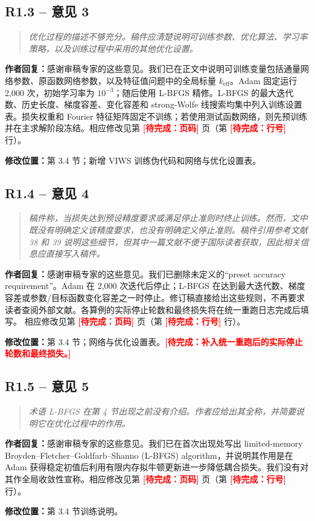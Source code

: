 \documentclass[11pt,a4paper]{article}
\newenvironment{reviewercomment}{\begin{quote}\small\itshape\color{commentgray}}{\end{quote}}
\newcommand{\authorresponse}{\noindent\textbf{作者回复：}\quad}
\newcommand{\revisionlocation}[1]{\par\noindent\textcolor{locationblue}{\textbf{修改位置：}}#1}
\newcommand{\draftplaceholder}[1]{\textcolor{red}{\textbf{[待完成：#1]}}}
\begin{document}
\subsection*{R1.3 -- 意见 3}
\begin{reviewercomment}
优化过程的描述不够充分。稿件应清楚说明可训练参数、优化算法、学习率策略，以及训练过程中采用的其他优化设置。
\end{reviewercomment}
\authorresponse 感谢审稿专家的这些意见。我们已在正文中说明可训练变量包括通量网络参数、原函数网络参数，以及特征值问题中的全局标量 $k_{\mathrm{eff}}$。Adam 固定运行 2,000 次，初始学习率为 $10^{-3}$；随后使用 L-BFGS 精修。L-BFGS 的最大迭代数、历史长度、梯度容差、变化容差和 strong-Wolfe 线搜索均集中列入训练设置表。损失权重和 Fourier 特征矩阵固定不训练；若使用测试函数网络，则先预训练并在主求解阶段冻结。相应修改见第 \draftplaceholder{页码} 页（第 \draftplaceholder{行号} 行）。
\revisionlocation{第 3.4 节；新增 VIWS 训练伪代码和网络与优化设置表。}

\subsection*{R1.4 -- 意见 4}
\begin{reviewercomment}
稿件称，当损失达到预设精度要求或满足停止准则时终止训练。然而，文中既没有明确定义该精度要求，也没有明确定义停止准则。稿件引用参考文献 38 和 39 说明这些细节，但其中一篇文献不便于国际读者获取，因此相关信息应直接写入稿件。
\end{reviewercomment}
\authorresponse 感谢审稿专家的这些意见。我们已删除未定义的“preset accuracy requirement”。Adam 在 2,000 次迭代后停止；L-BFGS 在达到最大迭代数、梯度容差或参数/目标函数变化容差之一时停止。修订稿直接给出这些规则，不再要求读者查阅外部文献。各算例的实际停止轮数和最终损失将在统一重跑日志完成后填写。
相应修改见第 \draftplaceholder{页码} 页（第 \draftplaceholder{行号} 行）。
\revisionlocation{第 3.4 节；网络与优化设置表。\draftplaceholder{补入统一重跑后的实际停止轮数和最终损失。}}

\subsection*{R1.5 -- 意见 5}
\begin{reviewercomment}
术语 L-BFGS 在第 4 节出现之前没有介绍。作者应给出其全称，并简要说明它在优化过程中的作用。
\end{reviewercomment}
\authorresponse 感谢审稿专家的这些意见。我们已在首次出现处写出 limited-memory Broyden--Fletcher--Goldfarb--Shanno (L-BFGS) algorithm，并说明其作用是在 Adam 获得稳定初值后利用有限内存拟牛顿更新进一步降低耦合损失。我们没有对其作全局收敛性宣称。相应修改见第 \draftplaceholder{页码} 页（第 \draftplaceholder{行号} 行）。
\revisionlocation{第 3.4 节训练说明。}
\end{document}
